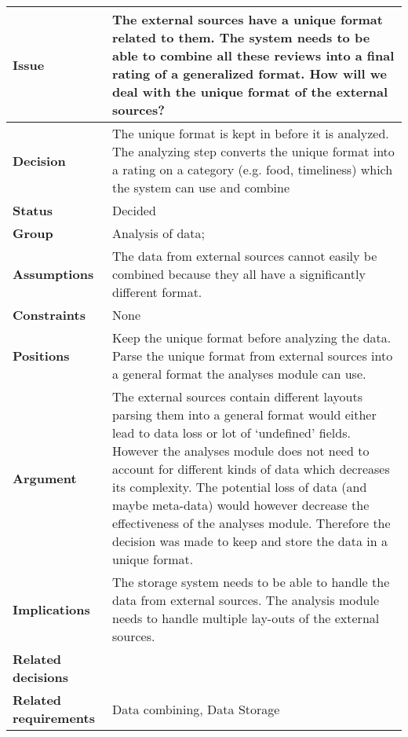 
{\large{}}
\begin{tabular}{ l  p{10cm}}
\hline
\bf Issue & The external sources have a unique format related to them. The system needs to be able to combine all these reviews into a final rating of a generalized format. How will we deal with the unique format of the external sources?\\
\hline
\bf Decision & The unique format is kept in before it is analyzed. The analyzing step converts the unique format into a rating on a category (e.g. food, timeliness) which the system can use and combine \\
\hline
\bf Status & Decided\\
\hline
\bf Group & Analysis of data; \\
\hline
\bf Assumptions & The data from external sources cannot easily be combined because they all have a significantly different format.  \\
\hline
\bf Constraints & None \\
\hline
\bf Positions & Keep the unique format before analyzing the data. \newline\newline
Parse the unique format from external sources into a general format the analyses module can use. 
 \\
\hline
\bf Argument & The external sources contain different layouts parsing them into a general format would either lead to data loss or lot of ‘undefined’ fields. However the analyses module does not need to account for different kinds of data which decreases its complexity. The potential loss of data (and maybe meta-data)  would however decrease the effectiveness of the analyses module. Therefore the decision was made to keep and store the data in a unique format.  \\
\hline
\bf Implications & The storage system needs to be able to handle the data from external sources. The analysis module needs to handle multiple lay-outs of the external sources.  \\
\hline
\bf Related decisions & \\
\hline
\bf Related requirements  & Data combining, Data Storage \\
\hline
\end{tabular}
